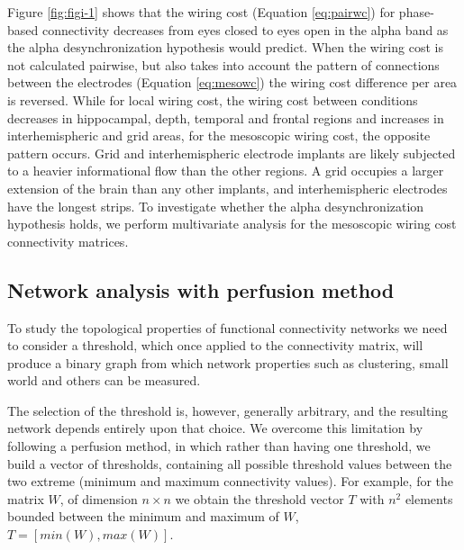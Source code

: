 \documentclass[11pt, onecolumn]{article}
\begin{document}
Figure \ref{fig:figi-1} shows that the wiring cost (Equation \ref{eq:pairwc}) for phase-based connectivity decreases from eyes closed to eyes open in the alpha band as the alpha desynchronization hypothesis would predict.
When the wiring cost is not calculated pairwise, but also takes into account the pattern of connections between the electrodes (Equation \ref{eq:mesowc}) the wiring cost difference per area is reversed. While for local wiring cost, the wiring cost between conditions decreases in hippocampal, depth, temporal and frontal regions and increases in interhemispheric and grid areas, for the mesoscopic wiring cost, the opposite pattern occurs. 
Grid and interhemispheric electrode implants are likely subjected to a heavier informational flow than the other regions. A grid occupies a larger extension of the brain than any other implants, and interhemispheric electrodes have the longest strips.  
To investigate whether the alpha desynchronization hypothesis holds, we perform multivariate analysis for the mesoscopic wiring cost connectivity matrices.
 
\subsection{Network analysis with perfusion method}
To study the  topological properties of functional connectivity networks we need to consider a threshold, which once applied to the connectivity matrix, will produce a binary graph from which network properties such as clustering, small world and others can be measured.

The selection of the threshold is, however, generally arbitrary, and the resulting network depends entirely upon that choice.
We overcome this limitation by following a perfusion method, in which rather than having one threshold, we build a vector of thresholds, containing all possible threshold values between the two extreme (minimum and maximum connectivity values). For example, for the matrix $W$, of dimension $n \times n$ we obtain the threshold vector $T$ with $n^2$ elements bounded between the minimum and maximum of $W$, $T = [min(W), max(W)]$.
 
\end{document}
